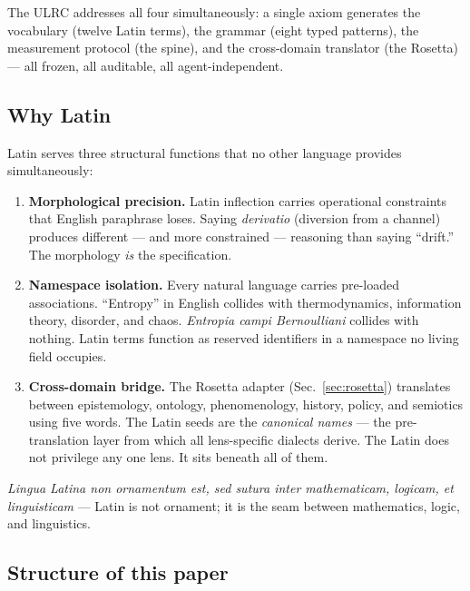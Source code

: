 \documentclass[
  aps,
  prd,
  twocolumn,
  superscriptaddress,
  nofootinbib,
  floatfix
]{revtex4-2}
\newcommand{\lat}[1]{\textit{#1}}
\begin{document}
\noindent
The ULRC addresses all four simultaneously: a single axiom
generates the vocabulary (twelve Latin terms), the grammar
(eight typed patterns), the measurement protocol (the spine),
and the cross-domain translator (the Rosetta) --- all frozen,
all auditable, all agent-independent.

\subsection{Why Latin}\label{sec:why-latin}

Latin serves three structural functions that no other language
provides simultaneously:

\begin{enumerate}[nosep,leftmargin=*]
\item \textbf{Morphological precision.}
  Latin inflection carries operational constraints that English
  paraphrase loses. Saying \lat{derivatio} (diversion from a
  channel) produces different --- and more constrained ---
  reasoning than saying ``drift.'' The morphology \emph{is}
  the specification.
\item \textbf{Namespace isolation.}
  Every natural language carries pre-loaded associations.
  ``Entropy'' in English collides with thermodynamics, information
  theory, disorder, and chaos. \lat{Entropia campi Bernoulliani}
  collides with nothing. Latin terms function as reserved
  identifiers in a namespace no living field occupies.
\item \textbf{Cross-domain bridge.}
  The Rosetta adapter (Sec.~\ref{sec:rosetta}) translates
  between epistemology, ontology, phenomenology, history, policy,
  and semiotics using five words. The Latin seeds are the
  \emph{canonical names} --- the pre-translation layer from
  which all lens-specific dialects derive. The Latin does not
  privilege any one lens. It sits beneath all of them.
\end{enumerate}

\noindent
\lat{Lingua Latina non ornamentum est, sed sutura inter
  mathematicam, logicam, et linguisticam} ---
Latin is not ornament; it is the seam between mathematics,
logic, and linguistics.

\subsection{Structure of this paper}
\end{document}
